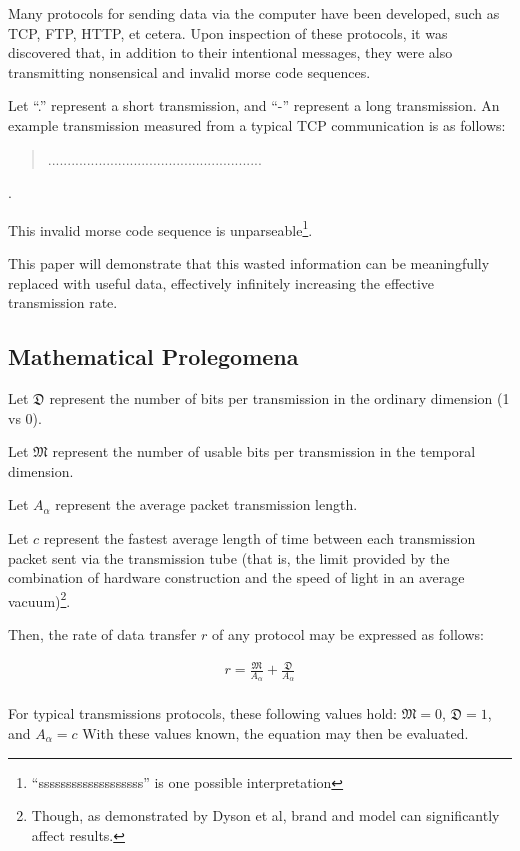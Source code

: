 \documentclass[sigplan]{acmart}
\begin{document}
Many protocols for sending data via the computer have been developed,
such as TCP, FTP, HTTP, et cetera. Upon inspection of these protocols,
it was discovered that, in addition to their intentional messages,
they were also transmitting nonsensical and invalid morse code
sequences.

Let ``.'' represent a short transmission, and ``-'' represent a long transmission.
An example transmission measured from a typical TCP communication is as follows:

\begin{quote}
.......................................................
\end{quote}.

This invalid morse code sequence is unparseable\footnote{``sssssssssssssssssss'' is one possible interpretation}.

This paper will demonstrate that this wasted information can be
meaningfully replaced with useful data, effectively infinitely increasing
the effective transmission rate.

\subsection{Mathematical Prolegomena}

Let $\mathfrak{D}$ represent the number of bits per transmission
in the ordinary dimension (1 vs 0).

Let $\mathfrak{M}$ represent the number of usable bits per transmission
in the temporal dimension.

Let $A_\alpha$ represent the average packet transmission length.

Let $c$ represent the fastest average length of time between each
transmission packet sent via the transmission tube (that is, the limit provided
by the combination of hardware construction and the speed of light
in an average vacuum)\footnote{ Though, as demonstrated by Dyson et al, brand and model can significantly
affect results.}.

Then, the rate of data transfer $r$ of any protocol may be expressed as follows:

\begin{eqnarray*}
    r = \frac{\mathfrak{M}}{A_\alpha} + \frac{\mathfrak{D}}{A_\alpha} \\
\end{eqnarray*}

For typical transmissions protocols, these following values hold:
$\mathfrak{M} = 0$, $\mathfrak{D} = 1$, and $A_\alpha = c$
With these values known, the equation may then be evaluated.
\end{document}
